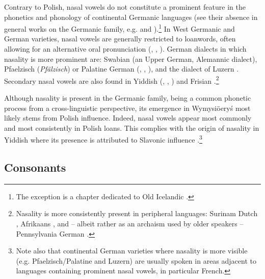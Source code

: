 \documentclass[output=paper,hidelinks]{langscibook}
\begin{document}
Contrary to Polish, nasal vowels do not constitute a prominent feature in the phonetics and phonology of continental Germanic languages (see their absence in general works on the Germanic family, e.g. \citealt{harbert_germanic_2007} and \citealt{jacobs_yiddish_1994}).\footnote{The exception is a chapter dedicated to Old Icelandic \citep[147]{rainsson_icelandic_1994}.} In West Germanic and German varieties, nasal vowels are generally restricted to loanwords, often allowing for an alternative oral pronunciation (\citealt[78, 108]{russ_german_1994}, \citealt[9]{fagan_german_2009}, \citealt[51, 73--74]{caratini_vocalic_2009}). German dialects in which nasality is more prominent are: Swabian (an Upper German, Alemannic dialect), Pfaelzisch (\textit{Pfälzisch}) or Palatine German (\citealt[423]{van_ness_pennsylvania_1994}, \citealt[71]{stevenson_german-speaking_1997}, \citealt[197]{niebaum_einfuhrung_1999}), and the dialect of Luzern \citep[179]{bacher_deutsche_1905}. Secondary nasal vowels are also found in Yiddish (\citealt[583--585, Addendum 606]{weinreich_history_2008}, \citealt[19--20, 41]{herzog_language_1992}, \citealt[97--99]{jacobs_yiddish_2005}) and Frisian \citep[508]{hoekstra_frisian_1994}.\footnote{Nasality is more consistently present in peripheral languages: Surinam Dutch \citep[444]{deschutter_dutch_1994}, Afrikaans \citep[481]{donaldson_afrikaans_1994}, and – albeit rather as an archaism used by older speakers -- Pennsylvania German \citep[423]{van_ness_pennsylvania_1994}.} 

Although nasality is present in the Germanic family, being a common phonetic process from a cross-linguistic perspective, its emergence in Wymysiöeryś most likely stems from Polish influence. Indeed, nasal vowels appear most commonly and most consistently in Polish loans. This complies with the origin of nasality in Yiddish where its presence is attributed to Slavonic influence \citep[583--585]{weinreich_history_2008}.\footnote{Note also that continental German varieties where nasality is more visible (e.g. Pfaelzisch/Palatine and Luzern) are usually spoken in areas adjacent to languages containing prominent nasal vowels, in particular French.}

\subsection{Consonants}\label{sec:wymsorys:4.4}
\end{document}
